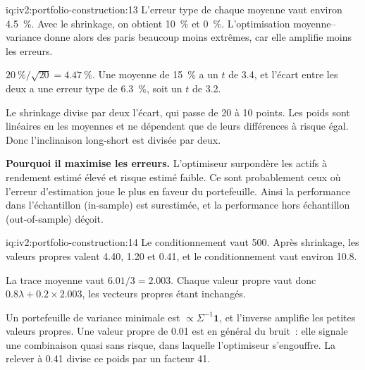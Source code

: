 \begin{solution}{iq:iv2:portfolio-construction:13}
L'erreur type de chaque moyenne vaut environ 4.5~\%. Avec le shrinkage, on obtient 10~\% et 0~\%. L'optimisation moyenne--variance donne alors des paris beaucoup moins extrêmes, car elle amplifie moins les erreurs.

$20~\%/\sqrt{20} = 4.47~\%$. Une moyenne de 15~\% a un $t$ de 3.4, et l'écart entre les deux a une erreur type de 6.3~\%, soit un $t$ de 3.2.

Le shrinkage divise par deux l'écart, qui passe de 20 à 10 points. Les poids sont linéaires en les moyennes et ne dépendent que de leurs différences à risque égal. Donc l'inclinaison long-short est divisée par deux.

\textbf{Pourquoi il maximise les erreurs.} L'optimiseur surpondère les actifs à rendement estimé élevé et risque estimé faible. Ce sont probablement ceux où l'erreur d'estimation joue le plus en faveur du portefeuille. Ainsi la performance dans l'échantillon (in-sample) est surestimée, et la performance hors échantillon (out-of-sample) déçoit.

\end{solution}

\begin{solution}{iq:iv2:portfolio-construction:14}
Le conditionnement vaut 500. Après shrinkage, les valeurs propres valent 4.40, 1.20 et 0.41, et le conditionnement vaut environ 10.8.

La trace moyenne vaut $6.01/3 = 2.003$. Chaque valeur propre vaut donc $0.8\lambda + 0.2 \times 2.003$, les vecteurs propres étant inchangés.

Un portefeuille de variance minimale est $\propto \Sigma^{-1}\mathbf{1}$, et l'inverse amplifie les petites valeurs propres. Une valeur propre de 0.01 est en général du bruit~: elle signale une combinaison quasi sans risque, dans laquelle l'optimiseur s'engouffre. La relever à 0.41 divise ce poids par un facteur 41.

\end{solution}

